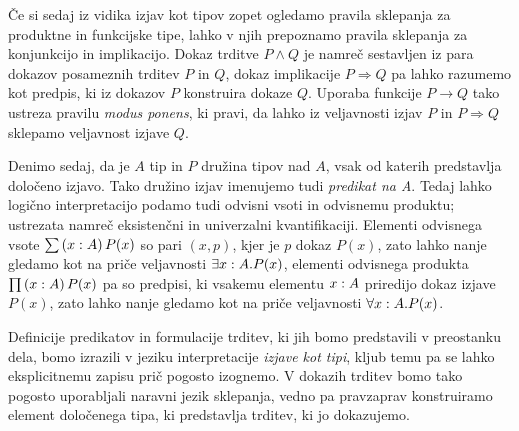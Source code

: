 Če si sedaj iz vidika izjav kot tipov zopet ogledamo pravila sklepanja za produktne in
funkcijske tipe, lahko v njih prepoznamo
pravila sklepanja za konjunkcijo in implikacijo. Dokaz trditve \(P \wedge Q\) je namreč sestavljen
iz para dokazov posameznih trditev \(P\) in \(Q\), dokaz implikacije \(P \Rightarrow Q\) pa lahko razumemo
kot predpis, ki iz dokazov \(P\) konstruira dokaze \(Q\). Uporaba funkcije \(P \to Q\)
tako ustreza pravilu \emph{modus ponens}, ki pravi, da lahko iz veljavnosti izjav \(P\) in \(P \Rightarrow Q\)
sklepamo veljavnost izjave \(Q\).

Denimo sedaj, da je \(A\) tip in \(P\) družina tipov nad \(A\), vsak od katerih predstavlja določeno
izjavo. Tako družino izjav imenujemo tudi \emph{predikat na A}.
Tedaj lahko logično interpretacijo podamo tudi odvisni vsoti in odvisnemu produktu;
ustrezata namreč eksistenčni in univerzalni kvantifikaciji. Elementi odvisnega vsote
\(\sum \left( x : A \right) P(x)\) so pari \((x, p)\), kjer je \(p\) dokaz \(P(x)\), zato lahko nanje gledamo
kot na priče veljavnosti \(\exists x : A. P(x)\), elementi odvisnega produkta
\(\prod \left( x : A \right) P(x)\) pa so predpisi, ki vsakemu elementu \(x : A\) priredijo
dokaz izjave \(P(x)\), zato lahko nanje gledamo kot na priče veljavnosti
\(\forall x : A.P(x)\).

Definicije predikatov in formulacije trditev, ki jih bomo predstavili v preostanku dela, bomo
izrazili v jeziku interpretacije \emph{izjave kot tipi}, kljub temu pa se lahko eksplicitnemu
zapisu prič pogosto izognemo. V dokazih trditev bomo tako pogosto uporabljali naravni
jezik sklepanja, vedno pa pravzaprav konstruiramo element določenega tipa, ki predstavlja trditev,
ki jo dokazujemo.

